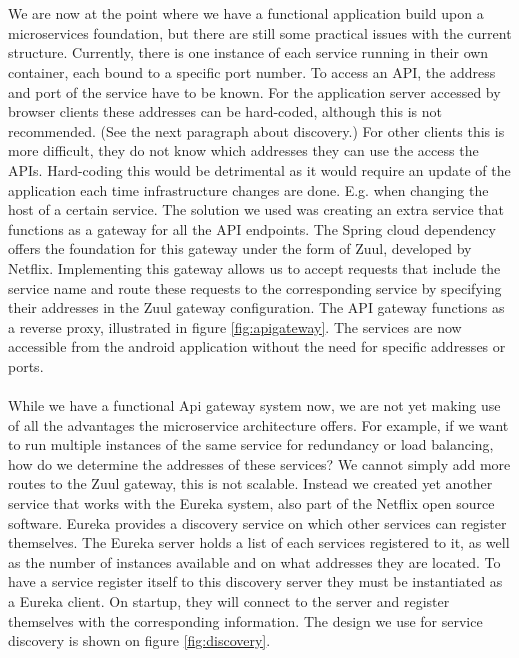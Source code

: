 \documentclass[12pt]{article}
\begin{document}
\begin{multicols}{2}
\\\\
We are now at the point where we have a functional application build upon a microservices foundation, but there are still some practical issues with the current structure. Currently, there is one instance of each service running in their own container, each bound to a specific port number. To access an API, the address and port of the service have to be known. For the application server accessed by browser clients these addresses can be hard-coded, although this is not recommended. (See the next paragraph about discovery.) For other clients this is more difficult, they do not know which addresses they can use the access the APIs. Hard-coding this would be detrimental as it would require an update of the application each time infrastructure changes are done. E.g. when changing the host of a certain service. The solution we used was creating an extra service that functions as a gateway for all the API endpoints. The Spring cloud dependency offers the foundation for this gateway under the form of Zuul, developed by Netflix. \cite{NetflixZuul76:online} Implementing this gateway allows us to accept requests that include the service name and route these requests to the corresponding service by specifying their addresses in the Zuul gateway configuration. The API gateway functions as a reverse proxy, illustrated in figure \ref{fig:apigateway}. The services are now accessible from the android application without the need for specific addresses or ports.
\\\\
\noindent While we have a functional Api gateway system now, we are not yet making use of all the advantages the microservice architecture offers. For example, if we want to run multiple instances of the same service for redundancy or load balancing, how do we determine the addresses of these services? We cannot simply add more routes to the Zuul gateway, this is not scalable. Instead we created yet another service that works with the Eureka system, also part of the Netflix open source software. Eureka provides a discovery service on which other services can register themselves. The Eureka server holds a list of each services registered to it, as well as the number of instances available and on what addresses they are located. To have a service register itself to this discovery server they must be instantiated as a Eureka client. On startup, they will connect to the server and register themselves with the corresponding information. The design we use for service discovery is shown on figure \ref{fig:discovery}.

\end{multicols}
\end{document}
